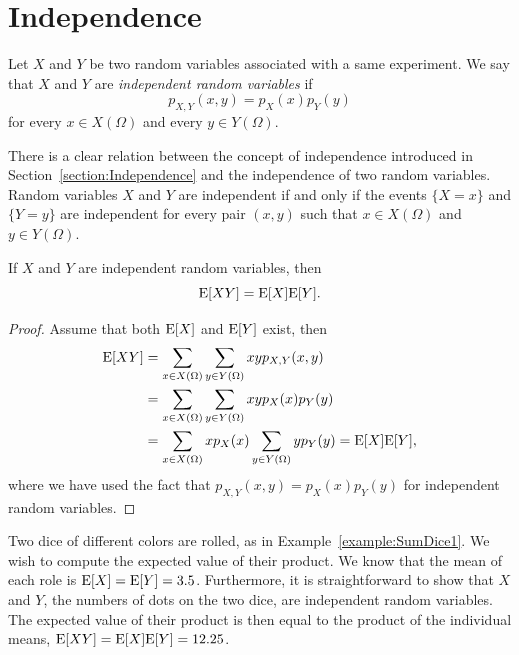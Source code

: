 \section{Independence}

Let $X$ and $Y$ be two random variables associated with a same experiment.
We say that $X$ and $Y$ are \emph{independent random variables} if 
\begin{equation*}
p_{X,Y} (x,y) = p_X (x) p_Y (y)
\end{equation*}
for every $x \in X(\Omega)$ and every $y \in Y(\Omega)$.

There is a clear relation between the concept of independence introduced in Section~\ref{section:Independence} and the independence of two random variables.
Random variables $X$ and $Y$ are independent if and only if the events $\{ X = x \}$ and $\{ Y = y \}$ are independent for every pair $(x, y)$ such that $x \in X(\Omega)$ and $y \in Y(\Omega)$.

\begin{proposition} \label{proposition:ExpectationProduct}
If $X$ and $Y$ are independent random variables, then
\begin{equation*}
\mathrm{E} [X Y] = \mathrm{E} [X] \mathrm{E} [Y] .
\end{equation*}
\end{proposition}
\begin{proof}
Assume that both $\mathrm{E} [X]$ and $\mathrm{E}[Y]$ exist, then
\begin{equation*}
\begin{split}
\mathrm{E} [XY]
&= \sum_{x \in X(\Omega)} \sum_{y \in Y(\Omega)} x y p_{X,Y} (x,y) \\
&= \sum_{x \in X(\Omega)} \sum_{y \in Y(\Omega)} x y p_X (x) p_Y (y) \\
&= \sum_{x \in X(\Omega)} x p_X (x) \sum_{y \in Y(\Omega)} y p_Y (y)
= \mathrm{E} [X] \mathrm{E} [Y] ,
\end{split}
\end{equation*}
where we have used the fact that $p_{X,Y} (x,y) = p_X (x) p_Y (y)$ for independent random variables.
\end{proof}

\begin{example}
Two dice of different colors are rolled, as in Example~\ref{example:SumDice1}.
We wish to compute the expected value of their product.
We know that the mean of each role is $\mathrm{E} [X] = \mathrm{E} [Y] = 3.5$.
Furthermore, it is straightforward to show that $X$ and $Y$, the numbers of dots on the two dice, are independent random variables.
The expected value of their product is then equal to the product of the individual means, $\mathrm{E} [XY] = \mathrm{E} [X] \mathrm{E} [Y] = 12.25$.
\end{example}

